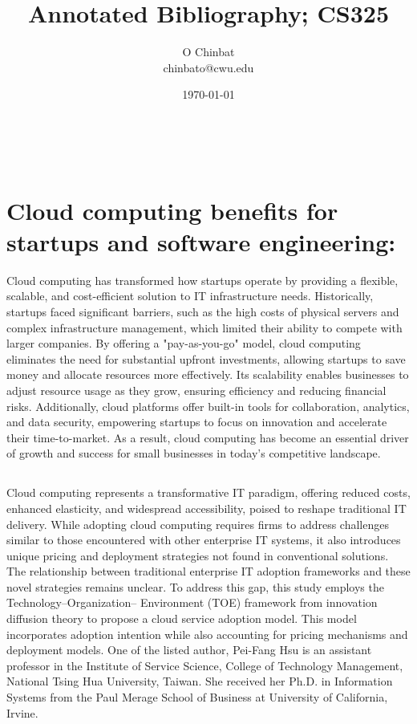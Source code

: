 \documentclass[12pt,letterpaper]{article}
\title{Annotated Bibliography; CS325}
\author{O Chinbat \\ chinbato@cwu.edu \\}
\date{\today}
\makeatletter
\renewcommand{\maketitle}{\bgroup
   \begin{center}
   \textbf{{\fontsize{18pt}{20}\selectfont \@title}}\\
   \vspace{10pt}
   {\fontsize{12pt}{0}\selectfont \@author} 
   {\fontsize{12pt}{0}\selectfont \@date} 
   \end{center}
}
\makeatother
\begin{document}
\maketitle
\thispagestyle{fancy}

\section*{Cloud computing benefits for startups and software engineering: }
Cloud computing has transformed how startups operate by providing a flexible, scalable, and cost-efficient solution to IT infrastructure needs. Historically, startups faced significant barriers, such as the high costs of physical servers and complex infrastructure management, which limited their ability to compete with larger companies. By offering a "pay-as-you-go" model, cloud computing eliminates the need for substantial upfront investments, allowing startups to save money and allocate resources more effectively. Its scalability enables businesses to adjust resource usage as they grow, ensuring efficiency and reducing financial risks. Additionally, cloud platforms offer built-in tools for collaboration, analytics, and data security, empowering startups to focus on innovation and accelerate their time-to-market. As a result, cloud computing has become an essential driver of growth and success for small businesses in today’s competitive landscape.

\subsection*{}
Cloud computing represents a transformative IT paradigm, offering reduced costs, enhanced elasticity, and widespread accessibility, poised to reshape traditional IT delivery. While adopting cloud computing requires firms to address challenges similar to those encountered with other enterprise IT systems, it also introduces unique pricing and deployment strategies not found in conventional solutions. The relationship between traditional enterprise IT adoption frameworks and these novel strategies remains unclear. To address this gap, this study employs the Technology–Organization– Environment (TOE) framework from innovation diffusion theory to propose a cloud service adoption model. This model incorporates adoption intention while also accounting for pricing mechanisms and deployment models. One of the listed author, Pei-Fang Hsu is an assistant professor in the Institute of Service Science, College of Technology Management, National Tsing Hua University, Taiwan. She received her Ph.D. in Information Systems from the Paul Merage School of Business at University of California, Irvine.
\end{document}
